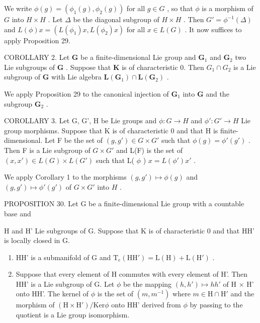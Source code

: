 We write \(\phi(g) = (\phi_1(g), \phi_2(g))\) for all \(g \in G\) , so that \(\phi\) is a morphism of \(G\) into \(H \times H\) . Let \(\Delta\) be the diagonal subgroup of \(H \times H\) . Then \(G' = \phi^{-1}(\Delta)\) and \(L(\phi)x = (L(\phi_1)x, L(\phi_2)x)\) for all \(x \in L(G)\) . It now suffices to apply Proposition 29.

COROLLARY 2. Let \(\mathbf{G}\) be a finite-dimensional Lie group and \(\mathbf{G}_1\) and \(\mathbf{G}_2\) two Lie subgroups of \(\mathbf{G}\) . Suppose that \(\mathbf{K}\) is of characteristic 0. Then \(G_1 \cap G_2\) is a Lie subgroup of \(\mathbf{G}\) with Lie algebra \(\mathbf{L}(\mathbf{G}_1) \cap \mathbf{L}(\mathbf{G}_2)\) .

We apply Proposition 29 to the canonical injection of \(\mathbf{G}_1\) into \(\mathbf{G}\) and the subgroup \(\mathbf{G}_2\) .

COROLLARY 3. Let G, G', H be Lie groups and \(\phi: G \to H\) and \(\phi': G' \to H\) Lie group morphisms. Suppose that K is of characteristic 0 and that H is finite-dimensional. Let F be the set of \((g, g') \in G \times G'\) such that \(\phi(g) = \phi'(g')\) . Then F is a Lie subgroup of \(G \times G'\) and L(F) is the set of \((x, x') \in L(G) \times L(G')\) such that L( \(\phi\) ) \(x = L(\phi')x'\) .

We apply Corollary 1 to the morphisms \((g, g') \mapsto \phi(g)\) and \((g, g') \mapsto \phi'(g')\) of \(G \times G'\) into \(H\) .

PROPOSITION 30. Let G be a finite-dimensional Lie group with a countable base and

H and H' Lie subgroups of G. Suppose that K is of characteristic 0 and that HH' is locally closed in G.

\begin{enumerate}
\def\labelenumi{(\roman{enumi})}
\item
  HH' is a submanifold of G and \(\mathrm{T}_{e}(\mathrm{HH}') = \mathrm{L}(\mathrm{H}) + \mathrm{L}(\mathrm{H}')\) .
\item
  Suppose that every element of H commutes with every element of H'. Then HH' is a Lie subgroup of G. Let \(\phi\) be the mapping \((h, h') \mapsto hh'\) of H \(\times\) H' onto HH'. The kernel of \(\phi\) is the set of \((m, m^{-1})\) where \(m \in \mathrm{H} \cap \mathrm{H}'\) and the morphism of \((\mathrm{H} \times \mathrm{H}') / \mathrm{Ker} \phi\) onto HH' derived from \(\phi\) by passing to the quotient is a Lie group isomorphism.
\end{enumerate}

